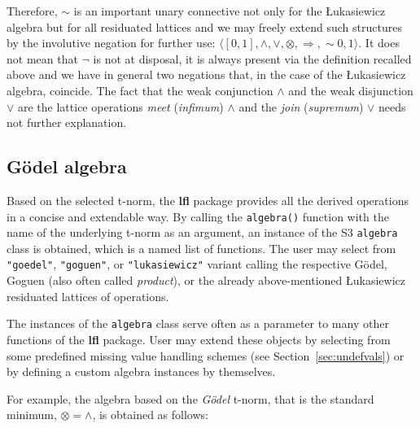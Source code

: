 \documentclass[review]{elsarticle}
\newcommand{\pkg}[1]{\textbf{#1}}
\newcommand{\code}[1]{\texttt{#1}}
\begin{document}
Therefore, $\sim$ is an important unary connective not only for the \L ukasiewicz algebra but for all residuated lattices and we may freely extend such structures by the involutive negation for further use: $\langle [0,1], \wedge, \vee, \otimes , \Rightarrow, \sim 0 , 1 \rangle$. It does not mean that $\neg$ is not at disposal, it is always present via the definition recalled above and we have in general two negations that, in the case of the \L ukasiewicz algebra, coincide. The fact that the weak conjunction $\wedge$ and the weak disjunction $\vee$ are the lattice operations \emph{meet} (\emph{infimum})  $\land$ and the \emph{join} (\emph{supremum})  $\lor$ needs not further explanation.


\subsection{G\"odel algebra}
\label{sec:goedel}


Based on the selected t-norm, the \pkg{lfl} package provides all the derived operations in a concise and extendable way. By calling the \code{algebra()} function with the name of the underlying t-norm as an argument, an instance of the S3 \code{algebra} class is obtained, which is a named list of functions. The user may select from \code{"goedel"}, \code{"goguen"}, or \code{"lukasiewicz"} variant calling the respective G\"odel, Goguen (also often called \emph{product}), or the already above-mentioned \L ukasiewicz residuated lattices of operations. 

The instances of the \code{algebra} class serve often as a parameter to many other functions of the \pkg{lfl} package. User may extend these objects by selecting from some predefined missing value handling schemes (see Section~\ref{sec:undefvals}) or by defining a custom algebra instances by themselves.


For example, the algebra based on the \emph{G\"odel} t-norm, that is the standard minimum, $\otimes = \wedge$, is obtained as follows:
%

\end{document}
